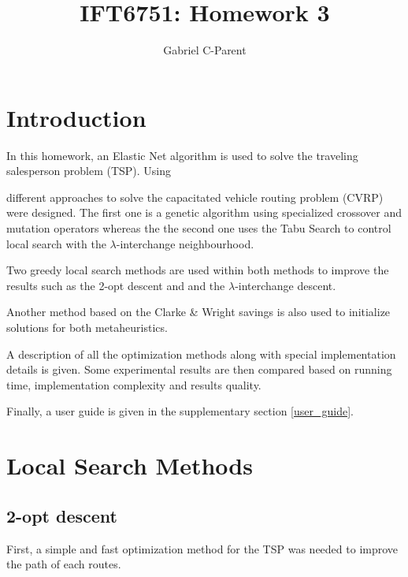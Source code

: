 \documentclass{article} %
\author{
Gabriel C-Parent\\
}
\begin{document}
\title{IFT6751: Homework 3}
      
\maketitle
\section{Introduction}

In this homework, an Elastic Net algorithm is used to solve the traveling salesperson problem (TSP). Using %

 different approaches to solve the capacitated vehicle routing problem (CVRP) were designed. The first one is a genetic algorithm using specialized crossover and mutation operators whereas the the second one uses the Tabu Search to control local search with the $\lambda$-interchange neighbourhood.\newline

Two greedy local search methods are used within both methods to improve the results such as the 2-opt descent and  and the $\lambda$-interchange descent.\newline

Another method based on the Clarke \& Wright savings is also used to initialize solutions for both metaheuristics.\newline




A description of all the optimization methods along with special implementation details is given.
Some experimental results are then compared based on running time, implementation complexity and results quality.\newline

Finally, a user guide is given in the supplementary section \ref{user_guide}.



\newpage
\section{Local Search Methods}
\label{local_search}

\subsection{2-opt descent}
\label{local_tsp}

First, a simple and fast optimization method for the TSP was needed to improve the path of each routes.\newline
\end{document}
